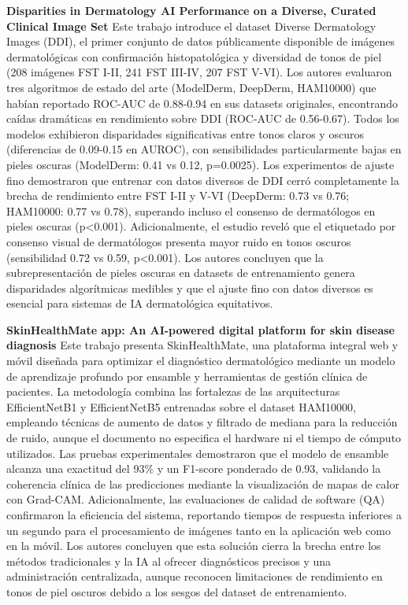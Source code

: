 \documentclass[11pt, a4paper]{article}
\begin{document}
\textbf{Disparities in Dermatology AI Performance on a Diverse, Curated Clinical Image Set} \cite{daneshjou_disparities_2022}
Este trabajo introduce el dataset Diverse Dermatology Images (DDI), el primer conjunto de datos públicamente disponible de imágenes dermatológicas con confirmación histopatológica y diversidad de tonos de piel (208 imágenes FST I-II, 241 FST
III-IV, 207 FST V-VI). Los autores evaluaron tres algoritmos de estado del arte (ModelDerm, DeepDerm, HAM10000) que habían reportado ROC-AUC de 0.88-0.94 en sus datasets originales, encontrando caídas dramáticas en rendimiento sobre DDI 
(ROC-AUC de 0.56-0.67). Todos los modelos exhibieron disparidades significativas entre tonos claros y oscuros (diferencias de 0.09-0.15 en AUROC), con sensibilidades particularmente bajas en pieles oscuras (ModelDerm: 0.41 vs 0.12, p=0.0025).
Los experimentos de ajuste fino demostraron que entrenar con datos diversos de DDI cerró completamente la brecha de rendimiento entre FST I-II y V-VI (DeepDerm: 0.73 vs 0.76; HAM10000: 0.77 vs 0.78), superando incluso el consenso de
dermatólogos en pieles oscuras (p<0.001). Adicionalmente, el estudio reveló que el etiquetado por consenso visual de dermatólogos presenta mayor ruido en tonos oscuros (sensibilidad 0.72 vs 0.59, p<0.001). Los autores concluyen que la
subrepresentación de pieles oscuras en datasets de entrenamiento genera disparidades algorítmicas medibles y que el ajuste fino con datos diversos es esencial para sistemas de IA dermatológica equitativos.

\textbf{SkinHealthMate app: An AI-powered digital platform for skin disease diagnosis} \cite{aboulmira_skinhealthmate_2024}
Este trabajo presenta SkinHealthMate, una plataforma integral web y móvil diseñada para optimizar el diagnóstico dermatológico mediante un modelo de aprendizaje profundo por ensamble y herramientas de gestión clínica de pacientes.
La metodología combina las fortalezas de las arquitecturas EfficientNetB1 y EfficientNetB5 entrenadas sobre el dataset HAM10000, empleando técnicas de aumento de datos y filtrado de mediana para la reducción de ruido, aunque el documento
no especifica el hardware ni el tiempo de cómputo utilizados. Las pruebas experimentales demostraron que el modelo de ensamble alcanza una exactitud del 93\% y un F1-score ponderado de 0.93, validando la coherencia clínica de las 
predicciones mediante la visualización de mapas de calor con Grad-CAM. Adicionalmente, las evaluaciones de calidad de software (QA) confirmaron la eficiencia del sistema, reportando tiempos de respuesta inferiores a un segundo para
el procesamiento de imágenes tanto en la aplicación web como en la móvil. Los autores concluyen que esta solución cierra la brecha entre los métodos tradicionales y la IA al ofrecer diagnósticos precisos y una administración centralizada,
aunque reconocen limitaciones de rendimiento en tonos de piel oscuros debido a los sesgos del dataset de entrenamiento.
\end{document}
